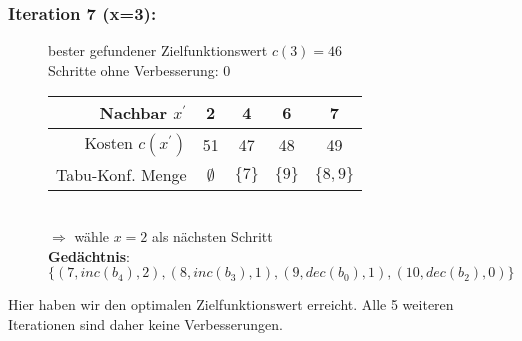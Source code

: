 \documentclass[12pt]{article}
\begin{document}
	\subsubsection*{Iteration 7 (x=3):}
	\begin{figure}[H]
		\centering
		bester gefundener Zielfunktionswert $c(3)=46$\\
		Schritte ohne Verbesserung: 0\\
		\begin{tabular}{r | cccc}
			Nachbar $x^\prime$   & 2 & 4 & 6 & 7\\\hline
			Kosten $c(x^\prime)$ & 51 & 47 & 48 & 49\\\hline
			Tabu-Konf. Menge     & $\emptyset$ & $\{7\}$ & $\{9\}$ & $\{8,9\}$\\
		\end{tabular}\\
		$\Rightarrow $ wähle $x=2$ als nächsten Schritt\\
		\textbf{Gedächtnis}: $\{(7,inc(b_4),2), (8, inc(b_3),1), (9, dec(b_0),1), (10, dec(b_2),0)\}$
	\end{figure}
	 Hier haben wir den optimalen Zielfunktionswert erreicht. Alle 5 weiteren Iterationen sind daher keine Verbesserungen.
	
	
\end{document}
